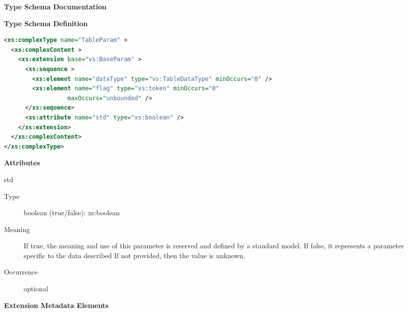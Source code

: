 \documentclass[11pt,a4paper]{ivoa}
\begin{document}
\begin{generated}
\begingroup
      	\renewcommand*\descriptionlabel[1]{%
      	\hbox to 5.5em{\emph{#1}\hfil}}\vspace{2ex}\noindent\textbf{ Type Schema Documentation}


\vspace{1ex}\noindent\textbf{ Type Schema Definition}

\begin{lstlisting}[language=XML,basicstyle=\footnotesize]
<xs:complexType name="TableParam" >
  <xs:complexContent >
    <xs:extension base="vs:BaseParam" >
      <xs:sequence >
        <xs:element name="dataType" type="vs:TableDataType" minOccurs="0" />
        <xs:element name="flag" type="xs:token" minOccurs="0"
                  maxOccurs="unbounded" />
      </xs:sequence>
      <xs:attribute name="std" type="xs:boolean" />
    </xs:extension>
  </xs:complexContent>
</xs:complexType>
\end{lstlisting}

\vspace{0.5ex}\noindent\textbf{ Attributes}

\begingroup\small\begin{bigdescription}
\item[std]
\begin{description}
\item[Type] boolean (true/false): xs:boolean
\item[Meaning] 
                     If true, the meaning and use of this parameter is
                     reserved and defined by a standard model.  If false, 
                     it represents a parameter specific to the data described 
                     If not provided, then the value is unknown.
                  
\item[Occurrence] optional
\end{description}


\end{bigdescription}\endgroup



\vspace{0.5ex}\noindent\textbf{ Extension Metadata Elements}


\end{generated}
\end{document}
